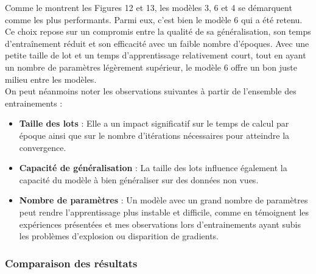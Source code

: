 \begin{multicols}{2}
Comme le montrent les Figures 12 et 13, les modèles 3, 6 et 4 se démarquent comme 
les plus performants. Parmi eux, c'est bien le modèle 6 qui a été retenu. Ce choix repose sur un 
compromis entre la qualité de sa généralisation, son temps d’entraînement réduit et 
son efficacité avec un faible nombre d’époques. Avec une petite taille de lot et un 
temps d’apprentissage relativement court, tout en ayant un nombre de paramètres 
légèrement supérieur, le modèle 6 offre un bon juste milieu entre les modèles. \\

On peut néanmoins noter les observations suivantes à partir de l'ensemble des entrainements :  
\begin{itemize}
    \item \textbf{Taille des lots} : Elle a un impact significatif sur le temps de calcul par époque ainsi que sur le nombre d’itérations nécessaires pour atteindre la convergence.  
    \item \textbf{Capacité de généralisation} : La taille des lots influence également la capacité du modèle à bien généraliser sur des données non vues.  
    \item \textbf{Nombre de paramètres} : Un modèle avec un grand nombre de paramètres peut rendre l’apprentissage plus instable et difficile, comme en témoignent les expériences présentées et mes observations lors 
    d'entrainements ayant subis les problèmes d'explosion ou disparition de gradients.
\end{itemize}



\subsubsection{Comparaison des résultats}

\end{multicols}